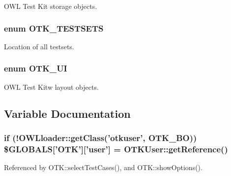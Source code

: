 OWL Test Kit storage objects. 

\subsubsection[{OTK\_\-TESTSETS}]{\setlength{\rightskip}{0pt plus 5cm}enum {\bf OTK\_\-TESTSETS}}\label{otk_8applic_8loader_8php_a349451a3473f742c0c64e9c13272e900}


Location of all testsets. 

\subsubsection[{OTK\_\-UI}]{\setlength{\rightskip}{0pt plus 5cm}enum {\bf OTK\_\-UI}}\label{otk_8applic_8loader_8php_a43baac16b48d1eae6e379ae2ea3bbfb9}


OWL Test Kitw layout objects. 



\subsection{Variable Documentation}
\subsubsection[{\$GLOBALS}]{\setlength{\rightskip}{0pt plus 5cm}if (!OWLloader::getClass('otkuser', {\bf OTK\_\-BO})) \$GLOBALS['{\bf OTK}']['user'] = OTKUser::getReference()}\label{otk_8applic_8loader_8php_ad9587c269106efedd641848ebbf0dcdf}


Referenced by OTK::selectTestCases(), and OTK::showOptions().

